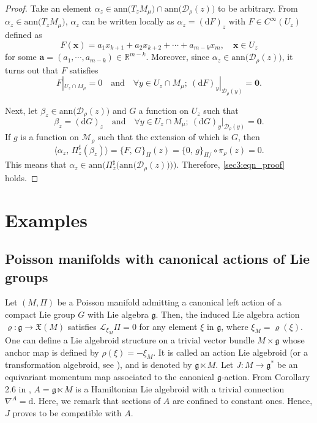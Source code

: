 \documentclass[a4paper,11pt,dvipdfmx]{article}
\numberwithin{equation}{section}
\begin{document}
\begin{proof}
Take an element $\alpha_z\in \mathrm{ann}\bigl(T_zM_{\mu}\bigr) \cap \mathrm{ann}\bigl(\mathcal{D}_{\rho}(z)\bigr)$ to be arbitrary. 
From $\alpha_z\in \mathrm{ann}\bigl(T_zM_{\mu}\bigr)$, 
$\alpha_z$ can be written locally as $\alpha_z = (\mathrm{d}F)_z$  %
with $F\in C^{\infty}(U_z)$ defined as 
\[
F(\boldsymbol{x})=a_1x_{k+1} + a_2x_{k+2}+\cdots +a_{m-k}x_{m},\quad \boldsymbol{x}\in U_z
\]
for some $\boldsymbol{a}=(a_1,\cdots,a_{m-k})\in \mathbb{R}^{m-k}$. Moreover, since $\alpha_z\in \mathrm{ann}\bigl(\mathcal{D}_{\rho}(z)\bigr)$, it turns out that $F$ satisfies 
\begin{equation}\label{sec3:eqn_proof2}
 F|_{U_z\cap M_{\mu}} = 0\quad \text{and}\quad \forall y\in U_z\cap M_{\mu};\ (\mathrm{d}F)_y|_{\mathcal{D}_{\rho}(y)} = \boldsymbol{0}. 
\end{equation}

Next, let $\beta_z\in \mathrm{ann}\bigl(\mathcal{D}_{\rho}(z)\bigr)$ and $G$ a function on $U_z$ such that 
\[
\beta_z=(\mathrm{d}G)_z\quad \text{and}\quad \forall y\in U_z\cap M_{\mu};\ 
(\mathrm{d}G)_y|_{\mathcal{D}_{\rho}(y)} = \boldsymbol{0}. 
\]
If $g$ is a function on $\mathcal{M}_{\rho}$ such that the extension of which is $G$, then 
\[
 \langle \alpha_z,\,\Pi^{\sharp}_z(\beta_z)\rangle = \{F,\,G\}_{\Pi}(z)=\{0,\,g\}_{\Pi/}\circ \pi_{\rho}(z)=0. 
\]
This means that $\alpha_z\in \mathrm{ann}\bigl(\Pi_z^{\sharp}\bigl(\mathrm{ann}\bigl(\mathcal{D}_{\rho}(z)\bigr)\bigr)\bigr)$. Therefore, \eqref{sec3:eqn_proof} holds. 
\end{proof}
\section{Examples}
\subsection{Poisson manifolds with canonical actions of Lie groups}\label{sec4:title}
Let $(M,\Pi)$ be a Poisson manifold admitting a canonical left action of a compact Lie group $G$ with Lie algebra $\mathfrak{g}$. 
Then, the induced Lie algebra action $\varrho:\mathfrak{g}\to \mathfrak{X}(M)$ satisfies $\mathcal{L}_{\xi_M}\Pi=0$ for any element $\xi$ in $\mathfrak{g}$, where $\xi_M=\varrho(\xi)$. 
One can define a Lie algebroid structure on a trivial vector bundle $M\times \mathfrak{g}$ whose anchor map is defined by $\rho(\xi)=-\xi_M$. 
It is called an action Lie algebroid (or a transformation algebroid, see \cite{DZpoi05}), and is denoted by $\mathfrak{g}\ltimes M$. 
Let $J:M\to \mathfrak{g}^*$ be an equivariant momentum map associated to the canonical $\mathfrak{g}$-action. From Corollary 2.6 in \cite{BRWham23}, 
$A=\mathfrak{g}\ltimes M$ is a Hamiltonian Lie algebroid with a trivial connection $\nabla^A=\mathrm{d}$. 
Here, we remark that sections of $A$ are confined to constant ones. Hence, $J$ proves to be compatible with $A$. 
\end{document}
